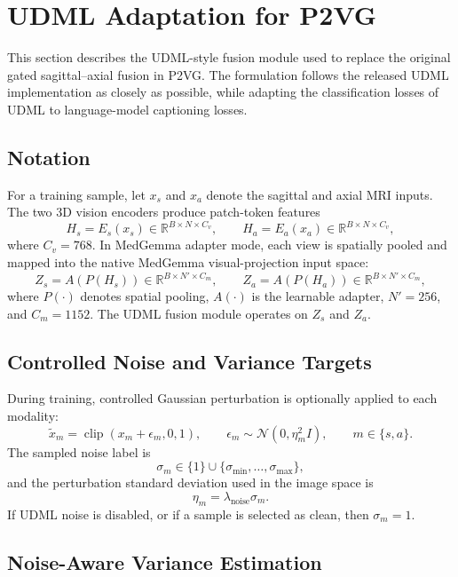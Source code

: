 \section{UDML Adaptation for P2VG}
\label{sec:udml_p2vg}

This section describes the UDML-style fusion module used to replace the original gated sagittal--axial fusion in P2VG. The formulation follows the released UDML implementation as closely as possible, while adapting the classification losses of UDML to language-model captioning losses.

\subsection{Notation}

For a training sample, let \(x_s\) and \(x_a\) denote the sagittal and axial MRI inputs. The two 3D vision encoders produce patch-token features
\[
    H_s = E_s(x_s) \in \mathbb{R}^{B \times N \times C_v},
    \qquad
    H_a = E_a(x_a) \in \mathbb{R}^{B \times N \times C_v},
\]
where \(C_v=768\). In MedGemma adapter mode, each view is spatially pooled and mapped into the native MedGemma visual-projection input space:
\[
    Z_s = A(P(H_s)) \in \mathbb{R}^{B \times N' \times C_m},
    \qquad
    Z_a = A(P(H_a)) \in \mathbb{R}^{B \times N' \times C_m},
\]
where \(P(\cdot)\) denotes spatial pooling, \(A(\cdot)\) is the learnable adapter, \(N'=256\), and \(C_m=1152\). The UDML fusion module operates on \(Z_s\) and \(Z_a\).

\subsection{Controlled Noise and Variance Targets}

During training, controlled Gaussian perturbation is optionally applied to each modality:
\[
    \tilde{x}_m
    =
    \operatorname{clip}(x_m + \epsilon_m, 0, 1),
    \qquad
    \epsilon_m \sim \mathcal{N}(0, \eta_m^2 I),
    \qquad
    m \in \{s,a\}.
\]
The sampled noise label is
\[
    \sigma_m \in \{1\} \cup \{\sigma_{\min}, \ldots, \sigma_{\max}\},
\]
and the perturbation standard deviation used in the image space is
\[
    \eta_m = \lambda_{\text{noise}}\sigma_m.
\]
If UDML noise is disabled, or if a sample is selected as clean, then \(\sigma_m=1\).

\subsection{Noise-Aware Variance Estimation}

